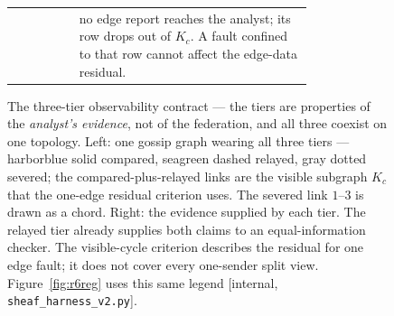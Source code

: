 \begin{figure}[htbp]
\begin{minipage}{0.56\textwidth}
\begin{tabular}{@{}cp{0.78\linewidth}@{}}
  & no edge report reaches the analyst; its row drops out of $K_c$. A fault confined to that row cannot affect the edge-data residual. \\
\end{tabular}
\end{minipage}
\caption{The three-tier observability contract --- the tiers are properties of the \emph{analyst's evidence}, not of the
federation, and all three coexist on one topology. Left: one gossip graph wearing all three tiers --- harborblue solid
compared, seagreen dashed relayed, gray dotted severed; the compared-plus-relayed links are the visible subgraph $K_c$ that
the one-edge residual criterion uses. The severed link $1$--$3$ is drawn as a chord. Right: the evidence supplied
by each tier. The relayed tier already supplies both claims to an equal-information checker. The visible-cycle
criterion describes the residual for one edge fault; it does not cover every one-sender split view.
Figure~\ref{fig:r6reg} uses this same legend [internal, \texttt{sheaf\_harness\_v2.py}].}
\label{fig:vis}
\end{figure}
